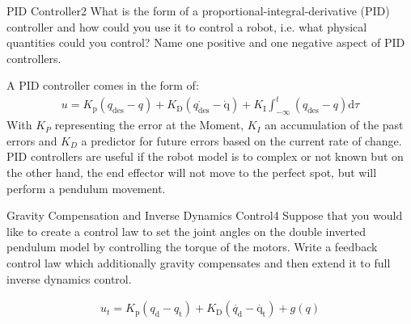 \begin{questions}
	
	
	\begin{question}{PID Controller}{2}
		What is the form of a proportional-integral-derivative (PID) controller and how could you use it to control a robot, i.e. what physical quantities could you control? Name one positive and one negative aspect of PID controllers.
		
\begin{answer}
A PID controller comes in the form of: \begin{align*}
	u=K_{\textrm{p}} (q_{\textrm{des}} - q) + K_{\textrm{D}} (\dot{q_{\textrm{des}}} - \dot{\textrm{q}}) + K_{\textrm{I}} \int_{-\infty}^{t}(q_{\textrm{des}} - q)\textrm{d}\tau
\end{align*}
With $K_P$ representing the error at the Moment, $K_I$ an accumulation of the past errors and $K_D$ a predictor for future errors based on the current rate of change. 
PID controllers are useful if the robot model is to complex or not known but on the other hand, the end effector will not move to the perfect spot, but will perform a pendulum movement.
\end{answer}
		
	\end{question}
	
		
	\begin{question}{Gravity Compensation and Inverse Dynamics Control}{4}
		Suppose that you would like to create a control law to set the joint angles on the double inverted pendulum model by controlling the torque of the motors. Write a feedback control law which additionally gravity compensates and then extend it to full inverse dynamics control. 
		
\begin{answer}
	\begin{align*}
		u_t=K_{\textrm{p}} (q_{\textrm{d}} - q_{\textrm{t}}) + K_{\textrm{D}} (\dot{q_{\textrm{d}}} - \dot{\textrm{q}_{\textrm{t}}}) + g(q)
	\end{align*}
\end{answer}
		

\end{question}
\end{questions}
